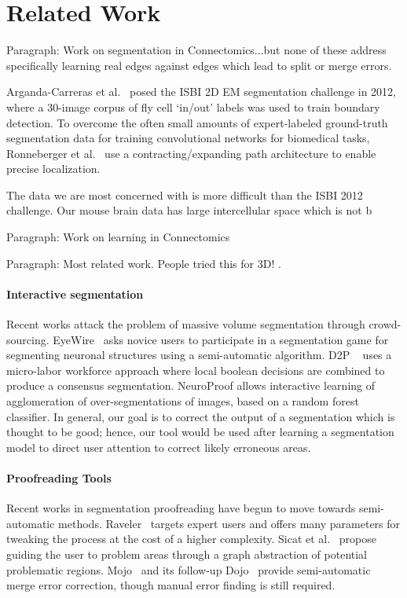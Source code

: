 \section{Related Work}

Paragraph: Work on segmentation in Connectomics...but none of these address specifically learning real edges against edges which lead to split or merge errors.

Arganda-Carreras et al.~\cite{10.3389/fnana.2015.00142} posed the ISBI 2D EM segmentation challenge in 2012, where a 30-image corpus of fly cell `in/out' labels was used to train boundary detection. To overcome the often small amounts of expert-labeled ground-truth segmentation data for training convolutional networks for biomedical tasks, Ronneberger et al.~\cite{RonnebergerFB15} use a contracting/expanding path architecture to enable precise localization.

The data we are most concerned with is more difficult than the ISBI 2012 challenge. Our mouse brain data has large intercellular space which is not b

Paragraph: Work on learning in Connectomics

Paragraph: Most related work. People tried this for 3D! \cite{BogovicHJ13}. 

\paragraph{Interactive segmentation}

Recent works attack the problem of massive volume segmentation through crowd-sourcing\cite{saalfeld09,anderson2011}. EyeWire~\cite{eyewire2012} asks novice users to participate in a segmentation game for segmenting neuronal structures using a semi-automatic algorithm. D2P ~\cite{Giuly2013DP2} uses a micro-labor workforce approach where local boolean decisions are combined to produce a consensus segmentation. NeuroProof \cite{neuroproof2013} allows interactive learning of agglomeration of over-segmentations of images, based on a random forest classifier. In general, our goal is to correct the output of a segmentation which is thought to be good; hence, our tool would be used after learning a segmentation model to direct user attention to correct likely erroneous areas.

\paragraph{Proofreading Tools}
Recent works in segmentation proofreading have begun to move towards semi-automatic methods. Raveler~\cite{raveler} targets expert users and offers many parameters for tweaking the process at the cost of a higher complexity. Sicat et al.~\cite{markus_proofreading} propose guiding the user to problem areas through a graph abstraction of potential problematic regions. Mojo~\cite{mojo2} and its follow-up Dojo~\cite{haehn_dojo_2014} provide semi-automatic merge error correction, though manual error finding is still required.


